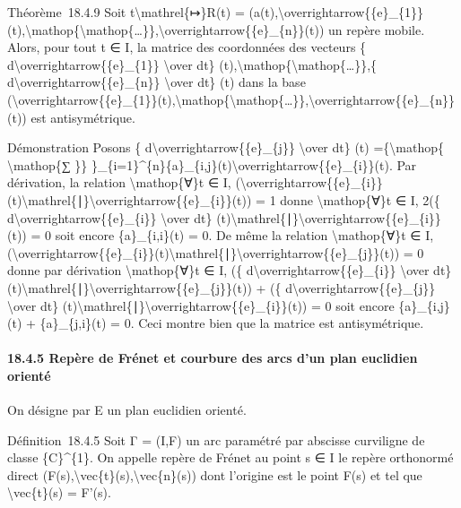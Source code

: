\documentclass[]{article}
\begin{document}
Théorème~18.4.9 Soit t\textbackslash{}mathrel\{↦\}R(t) =
(a(t),\textbackslash{}overrightarrow\{\{e\}\_\{1\}\}(t),\textbackslash{}mathop\{\textbackslash{}mathop\{\ldots{}\}\},\textbackslash{}overrightarrow\{\{e\}\_\{n\}\}(t))
un repère mobile. Alors, pour tout t ∈ I, la matrice des coordonnées des
vecteurs \{ d\textbackslash{}overrightarrow\{\{e\}\_\{1\}\}
\textbackslash{}over dt\}
(t),\textbackslash{}mathop\{\textbackslash{}mathop\{\ldots{}\}\},\{
d\textbackslash{}overrightarrow\{\{e\}\_\{n\}\} \textbackslash{}over
dt\} (t) dans la base
(\textbackslash{}overrightarrow\{\{e\}\_\{1\}\}(t),\textbackslash{}mathop\{\textbackslash{}mathop\{\ldots{}\}\},\textbackslash{}overrightarrow\{\{e\}\_\{n\}\}(t))
est antisymétrique.

Démonstration Posons \{ d\textbackslash{}overrightarrow\{\{e\}\_\{j\}\}
\textbackslash{}over dt\} (t) =\{\textbackslash{}mathop\{
\textbackslash{}mathop\{∑ \}\}
\}\_\{i=1\}\^{}\{n\}\{a\}\_\{i,j\}(t)\textbackslash{}overrightarrow\{\{e\}\_\{i\}\}(t).
Par dérivation, la relation \textbackslash{}mathop\{∀\}t ∈ I,
(\textbackslash{}overrightarrow\{\{e\}\_\{i\}\}(t)\textbackslash{}mathrel\{∣\}\textbackslash{}overrightarrow\{\{e\}\_\{i\}\}(t))
= 1 donne \textbackslash{}mathop\{∀\}t ∈ I, 2(\{
d\textbackslash{}overrightarrow\{\{e\}\_\{i\}\} \textbackslash{}over
dt\}
(t)\textbackslash{}mathrel\{∣\}\textbackslash{}overrightarrow\{\{e\}\_\{i\}\}(t))
= 0 soit encore \{a\}\_\{i,i\}(t) = 0. De même la relation
\textbackslash{}mathop\{∀\}t ∈ I,
(\textbackslash{}overrightarrow\{\{e\}\_\{i\}\}(t)\textbackslash{}mathrel\{∣\}\textbackslash{}overrightarrow\{\{e\}\_\{j\}\}(t))
= 0 donne par dérivation \textbackslash{}mathop\{∀\}t ∈ I, (\{
d\textbackslash{}overrightarrow\{\{e\}\_\{i\}\} \textbackslash{}over
dt\}
(t)\textbackslash{}mathrel\{∣\}\textbackslash{}overrightarrow\{\{e\}\_\{j\}\}(t))
+ (\{ d\textbackslash{}overrightarrow\{\{e\}\_\{j\}\}
\textbackslash{}over dt\}
(t)\textbackslash{}mathrel\{∣\}\textbackslash{}overrightarrow\{\{e\}\_\{i\}\}(t))
= 0 soit encore \{a\}\_\{i,j\}(t) + \{a\}\_\{j,i\}(t) = 0. Ceci montre
bien que la matrice est antisymétrique.

\paragraph{18.4.5 Repère de Frénet et courbure des arcs d'un plan
euclidien orienté}

On désigne par E un plan euclidien orienté.

Définition~18.4.5 Soit Γ = (I,F) un arc paramétré par abscisse
curviligne de classe \{C\}\^{}\{1\}. On appelle repère de Frénet au
point s ∈ I le repère orthonormé direct
(F(s),\textbackslash{}vec\{t\}(s),\textbackslash{}vec\{n\}(s)) dont
l'origine est le point F(s) et tel que \textbackslash{}vec\{t\}(s) =
F'(s).
\end{document}
